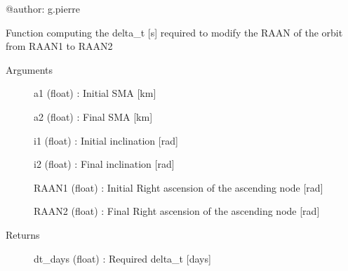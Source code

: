 \documentclass[letterpaper,10pt,english]{sphinxmanual}
\begin{document}
@author: g.pierre

\begin{fulllineitems}
\label{\detokenize{regroupement/dV_computations:regroupement.dV_computations.compute_dt_alignment.compute_dt}}
Function computing the delta\_t {[}s{]} required to modify the RAAN of the orbit from RAAN1 to RAAN2
\begin{description}
\item[{Arguments}] \leavevmode{[}{]}
a1 (float) : Initial SMA {[}km{]}

a2 (float) : Final SMA {[}km{]}

i1 (float) : Initial inclination {[}rad{]}

i2 (float) : Final inclination {[}rad{]}

RAAN1 (float) : Initial Right ascension of the ascending node {[}rad{]}

RAAN2 (float) : Final Right ascension of the ascending node {[}rad{]}

\item[{Returns}] \leavevmode{[}{]}
dt\_days (float) : Required delta\_t {[}days{]}

\end{description}

\end{fulllineitems}

\end{document}
